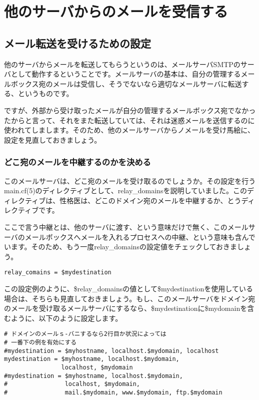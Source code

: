 \chapter{他のサーバからのメールを受信する}

\section{メール転送を受けるための設定}

他のサーバからメールを転送してもらうというのは、メールサーバSMTPのサーバとして動作するということです。メールサーバの基本は、自分の管理するメールボックス宛のメールは受信し、そうでないなら適切なメールサーバに転送する、というものです。

ですが、外部から受け取ったメールが自分の管理するメールボックス宛でなかったからと言って、それをまた転送していては、それは迷惑メールを送信するのに使われてしまします。そのため、他のメールサーバからノメールを受け馬絵に、設定を見直しておきましょう。

\subsection{どこ宛のメールを中継するのかを決める}
このメールサーバは、どこ宛のメールを受け取るのでしょうか。その設定を行うmain.cf(5)のディレクティブとして、relay\_domainsを説明していました。このディレクティブは、性格医は、どこのドメイン宛のメールを中継するか、とうディレクティブです。

ここで言う中継とは、他のサーバに渡す、という意味だけで無く、このメールサーバのメールボックスへメールを入れるプロセスへの中継、という意味も含んでいます。そのため、もう一度relay\_domainsの設定値をチェックしておきましょう。

\begin{lstlisting}[basicstyle=\ttfamily\footnotesize, frame=single]
relay_comains = $mydestination
\end{lstlisting}

この設定例のように、\$relay\_domainsの値として\$mydestinationを使用している場合は、そちらも見直しておきましょう。もし、このメールサーバをドメイン宛のメールを受け取るメールサーバにするなら、\$mydestinationに\$mydomainを含むように、以下のように設定します。

\begin{lstlisting}[basicstyle=\ttfamily\footnotesize, frame=single]
# ドメインのメールｓ-バニするなら2行目か状況によっては
# 一番下の例を有効にする
#mydestination = $myhostname, localhost.$mydomain, localhost
mydestination = $myhostname, localhost.$mydomain,
                localhost, $mydomain
#mydestination = $myhostname, localhost.$mydomain, 
#                localhost, $mydomain,
#                mail.$mydomain, www.$mydomain, ftp.$mydomain
\end{lstlisting}

